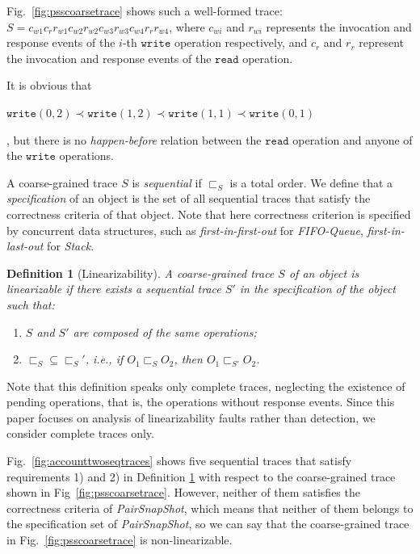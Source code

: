 \documentclass[runningheads]{llncs}
\newtheorem{myDef}{Definition}
\newcommand{\wri}{\mathtt{write}}
\newcommand{\rea}{\mathtt{read}}
\newcommand{\hb}{\textit{happen-before }}
\begin{document}
\begin{example}
Fig.~\ref{fig:psscoarsetrace} shows such a well-formed trace:
$S = c_{w1}c_rr_{w1}c_{w2}r_{w2}c_{w3}r_{w3}c_{w4}r_{r}r_{w4}$, where $c_{wi}$ and $r_{wi}$
represents the invocation and response events of the $i$-th $\mathtt{write}$ operation respectively, and
$c_r$ and $r_r$ represent the invocation and response events of the $\mathtt{read}$ operation.

It is obvious that \begin{small}$\wri(0,2)\prec \wri(1,2)\prec \wri(1,1)\prec \wri(0,1)$\end{small}, 
but there is no \hb  
relation between the $\rea$ operation and anyone of the $\wri$ operations.

\end{example}




A coarse-grained trace $S$ is \textit{sequential} if $\sqsubset_S$ is a total order. 
We define that a \textit{specification} of an object is the set of all sequential traces that satisfy the correctness criteria of that object. 
Note that here correctness criterion is specified by concurrent data structures, such as \textit{first-in-first-out} for \textit{FIFO-Queue}, \textit{first-in-last-out} for \textit{Stack}.

\vspace{-0.2cm}
\begin{myDef}[Linearizability]\label{def:linearizability}
A coarse-grained trace $S$ of an object is linearizable if there exists a sequential trace $S'$ in the specification of the object such that:
\begin{enumerate}
  \item $S$ and $S'$ are composed of the same operations;
  \item $\sqsubset_S \subseteq \sqsubset_S'$, i.e., if $O_1\sqsubset_S O_2$, then $O_1\sqsubset_{S'} O_2$.
\end{enumerate}
\end{myDef}
\vspace{-0.2cm}

Note that this definition speaks only complete traces, neglecting the existence of pending operations, that is, the operations without response events. Since this paper focuses on analysis of linearizability faults rather than detection, we consider complete traces only.

\vspace{-0.1cm}
\begin{example}
Fig.~\ref{fig:accounttwoseqtraces} shows five sequential traces that satisfy requirements 1) and 2) in Definition \ref{def:linearizability} with respect to the coarse-grained trace shown in Fig~\ref{fig:psscoarsetrace}. However, neither of them satisfies the correctness criteria of \textit{PairSnapShot}, which means that neither of them belongs to the specification set of \textit{PairSnapShot}, so we can say that the coarse-grained trace in Fig.~\ref{fig:psscoarsetrace} is non-linearizable.

\end{example}
\vspace{-0.7cm}
\end{document}
